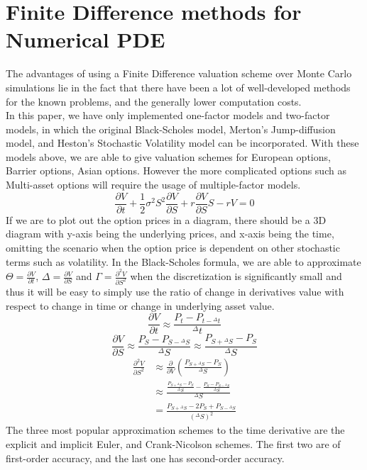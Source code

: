 \section{Finite Difference methods for Numerical PDE}
The advantages of using a Finite Difference valuation scheme over Monte Carlo simulations lie in the fact that there have been a lot of well-developed methods for the known problems, and the generally lower computation costs.\\[3mm]
In this paper, we have only implemented one-factor models and two-factor models, in which the original Black-Scholes model, Merton's Jump-diffusion model, and Heston's Stochastic Volatility model can be incorporated. With these models above, we are able to give valuation schemes for European options, Barrier options, Asian options. However the more complicated options such as Multi-asset options will require the usage of multiple-factor models.
$$\frac{\partial V}{\partial t}+\frac{1}{2}\sigma^{2}S^{2}\frac{\partial V}{\partial S}+r\frac{\partial V}{\partial S}S- rV = 0$$
If we are to plot out the option prices in a diagram, there should be a 3D diagram with y-axis being the underlying prices, and x-axis being the time, omitting the scenario when the option price is dependent on other stochastic terms such as volatility.
In the Black-Scholes formula, we are able to approximate $\Theta = \frac{\partial V}{\partial t}$, $\Delta = \frac{\partial V}{\partial S}$ and $\Gamma = \frac{\partial^{2} V}{\partial S^{2}}$ when the discretization is significantly small and thus it will be easy to simply use the ratio of change in derivatives value with respect to change in time or change in underlying asset value.\\
$$\frac{\partial V}{\partial t} \approx \frac{P_{t} - P_{t-{^{\Delta}t}}}{^{\Delta}t}$$
$$\frac{\partial V}{\partial S} \approx \frac{P_{S} - P_{S-{^{\Delta}S}}}{^{\Delta}S} \approx \frac{P_{S+{^{\Delta}S}} - P_{S}}{^{\Delta}S}$$
\begin{equation*}
\begin{split}
\frac{\partial^{2} V}{\partial S^{2}}
&\approx \frac{\partial}{\partial V}(\frac{P_{S+{^{\Delta}S}} - P_{S}}{^{\Delta}S})\\
&\approx \frac{\frac{P_{S+{^{\Delta}S}} - P_{S}}{^{\Delta}S} - \frac{P_{S} - P_{S-{^{\Delta}S}}}{^{\Delta}S}}{^{\Delta}S}\\
&= \frac{P_{S+{^{\Delta}S}} - 2P_{S} + P_{S-{^{\Delta}S}}}{(^{\Delta}S)^{2}}
\end{split}
\end{equation*}
The three most popular approximation schemes to the time derivative are the explicit and implicit Euler, and Crank-Nicolson schemes. The first two are of first-order accuracy, and the last one has second-order accuracy\cite{FiniteDifference}.
\newpage

